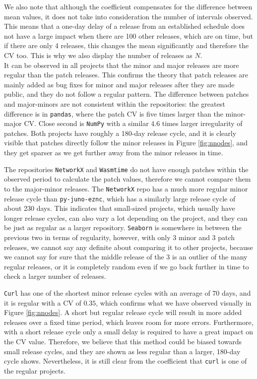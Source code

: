 We also note that although the coefficient compensates for the difference between mean values, it does not take into consideration the number of intervals observed. This means that a one-day delay of a release from an established schedule does not have a large impact when there are 100 other releases, which are on time, but if there are only 4 releases, this changes the mean significantly and therefore the CV too. This is why we also display the number of releases as $N$. \\

It can be observed in all projects that the minor and major releases are more regular than the patch releases. This confirms the theory that patch releases are mainly added as bug fixes for minor and major releases after they are made public, and they do not follow a regular pattern. The difference between patches and major-minors are not consistent within the repositories: the greatest difference is in \texttt{pandas}, where the patch CV is five times larger than the minor-major CV. Close second is \texttt{NumPy} with a similar 4.6 times larger irregularity of patches. Both projects have roughly a 180-day release cycle, and it is clearly visible that patches directly follow the minor releases in Figure \ref{fig:nnodes}, and they get sparser as we get further away from the minor releases in time.

The repositories \texttt{NetworkX} and \texttt{Wasmtime} do not have enough patches within the observed period to calculate the patch values, therefore we cannot compare them to the major-minor releases. The \texttt{NetworkX} repo has a much more regular minor release cycle than \texttt{py-juno-eznc}, which has a similarly large release cycle of about 230 days. This indicates that small-sized projects, which usually have longer release cycles, can also vary a lot depending on the project, and they can be just as regular as a larger repository. \texttt{Seaborn} is somewhere in between the previous two in terms of regularity, however, with only 3 minor and 3 patch releases, we cannot say any definite about comparing it to other projects, because we cannot say for sure that the middle release of the 3 is an outlier of the many regular releases, or it is completely random even if we go back further in time to check a larger number of releases.

\texttt{Curl} has one of the shortest minor release cycles with an average of 70 days, and it is regular with a CV of $0.35$, which confirms what we have observed visually in Figure \ref{fig:nnodes}. A short but regular release cycle will result in more added releases over a fixed time period, which leaves room for more errors. Furthermore, with a short release cycle only a small delay is required to have a great impact on the CV value. Therefore, we believe that this method could be biased towards small release cycles, and they are shown as less regular than a larger, 180-day cycle shows. Nevertheless, it is still clear from the coefficient that \texttt{curl} is one of the regular projects.

